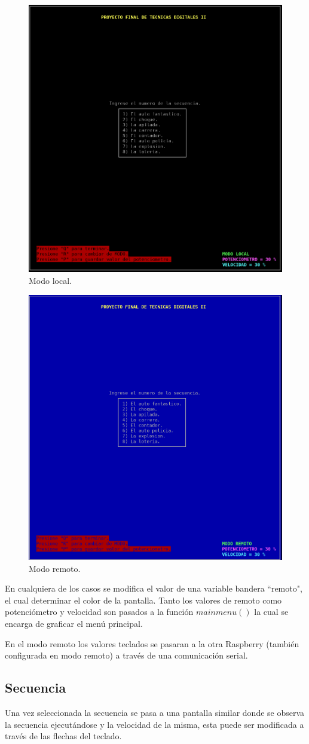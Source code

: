 \documentclass[11pt, a4paper]{article}
\begin{document}
\begin{figure}[H]
	\centering
	\includegraphics[width =0.5\columnwidth]{Imagenes/principal.png}
	\caption{Modo local.}
	\label{fig:local}
\end{figure}
\begin{figure}[H]
	\centering
	\includegraphics[width =0.5\columnwidth]{Imagenes/remoto.png}
	\caption{Modo remoto.}
	\label{fig:remoto}
\end{figure}
En cualquiera de los casos se modifica el valor de una variable bandera ``remoto", el cual determinar el color de la pantalla. Tanto los valores de remoto como potenciómetro y velocidad son pasados a la función $mainmenu()$ la cual se encarga de graficar el menú principal.

En el modo remoto los valores teclados se pasaran a la otra Raspberry (también configurada en modo remoto) a través de una comunicación serial.

\subsection {Secuencia}
Una vez seleccionada la secuencia se pasa a una pantalla similar donde se observa la secuencia ejecutándose y la velocidad de la misma, esta puede ser modificada a través de las flechas del teclado.
\end{document}
